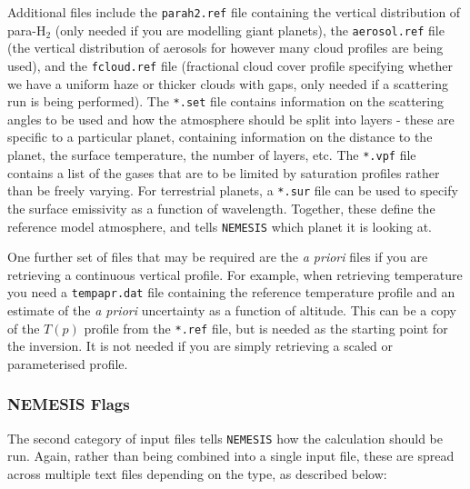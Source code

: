 \documentclass[final,5p,times,twocolumn,authoryear]{elsarticle}
\begin{document}
Additional files include the \verb#parah2.ref# file containing the vertical distribution of para-H$_2$ (only needed if you are modelling giant planets), the \verb#aerosol.ref# file (the vertical distribution of aerosols for however many cloud profiles are being used), and the \verb#fcloud.ref# file (fractional cloud cover profile specifying whether we have a uniform haze or thicker clouds with gaps, only needed if a scattering run is being performed).  The \verb#*.set# file contains information on the scattering angles to be used and how the atmosphere should be split into layers - these are specific to a particular planet, containing information on the distance to the planet, the surface temperature, the number of layers, etc.  The \verb#*.vpf# file contains a list of the gases that are to be limited by saturation profiles rather than be freely varying.  For terrestrial planets, a \verb#*.sur# file can be used to specify the surface emissivity as a function of wavelength.  Together, these define the reference model atmosphere, and tells \verb#NEMESIS# which planet it is looking at.

One further set of files that may be required are the \textit{a priori} files if you are retrieving a continuous vertical profile.  For example, when retrieving temperature you need a \verb#tempapr.dat# file containing the reference temperature profile and an estimate of the \textit{a priori} uncertainty as a function of altitude.  This can be a copy of the $T(p)$ profile from the \verb#*.ref# file, but is needed as the starting point for the inversion.  It is not needed if you are simply retrieving a scaled or parameterised profile.  

\subsubsection{NEMESIS Flags}

The second category of input files tells \verb#NEMESIS# how the calculation should be run.  Again, rather than being combined into a single input file, these are spread across multiple text files depending on the type, as described below:
\end{document}
